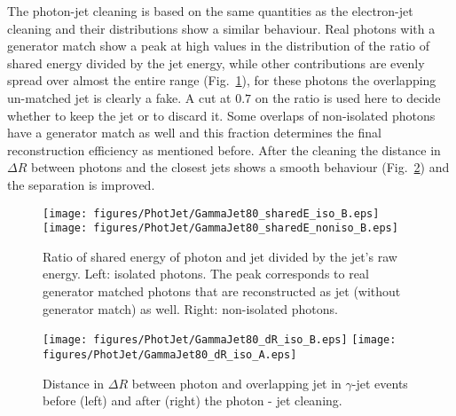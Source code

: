 \documentclass{cmspaper}
\begin{document}
The photon-jet cleaning is based on the same quantities as the electron-jet
cleaning and their distributions show a similar behaviour. Real photons
with a generator match show a peak at high values in the distribution of the
ratio of shared
energy divided by the jet energy, while other contributions are evenly
spread over almost the entire range (Fig.~\ref{fig:pjSharedE}),  for these
photons the overlapping un-matched jet is clearly a fake.  A cut at $0.7$
on the ratio
is used here to decide whether to keep the jet or to discard it. Some overlaps
of non-isolated photons have a generator match as well and this fraction
determines the final reconstruction efficiency as mentioned before. After the
cleaning the distance in $\Delta R$ between photons and the closest jets shows
a smooth behaviour (Fig.~\ref{fig:pjDeltaR}) and the separation is improved. 
\begin{figure}[hbtp]
  \begin{center}
    \texttt{[image: figures/PhotJet/GammaJet80\_sharedE\_iso\_B.eps]}
    \texttt{[image: figures/PhotJet/GammaJet80\_sharedE\_noniso\_B.eps]}
    \caption{Ratio of shared energy of photon and jet divided by the jet's raw
    energy. Left: isolated photons. The peak corresponds to real generator
    matched photons that are reconstructed as jet (without generator match) as
    well. Right: non-isolated photons.}
    \label{fig:pjSharedE}
  \end{center}
\end{figure}
\begin{figure}[hbtp]
  \begin{center}
    \texttt{[image: figures/PhotJet/GammaJet80\_dR\_iso\_B.eps]}
    \texttt{[image: figures/PhotJet/GammaJet80\_dR\_iso\_A.eps]}
    \caption{Distance in $\Delta R$ between photon and overlapping jet in
    $\gamma$-jet events before (left) and after (right) the photon - jet cleaning.}
    \label{fig:pjDeltaR}
  \end{center}
\end{figure}
\end{document}
